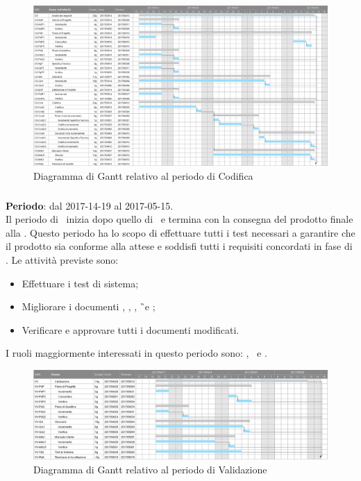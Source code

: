 		\begin{figure}[ht]
			\centering
			\includegraphics[scale=0.30]{img/ganttnetbreak4.png}
			\caption{Diagramma di Gantt relativo al periodo di Codifica}
		\end{figure}
		\FloatBarrier
		
		\subsubsection{\VV}
		\textbf{Periodo}: dal 2017-14-19 al 2017-05-15.\\
		Il periodo di \VV\ inizia dopo quello di \CO\ e termina con la consegna del prodotto finale alla \RA. Questo periodo ha lo scopo di effettuare tutti i test necessari a garantire che il prodotto sia conforme alla attese e soddisfi tutti i requisiti concordati in fase di \AdR. Le attività previste sono:
		\begin{itemize}
			\item Effettuare i test di sistema;
			\item Migliorare i documenti \NdP, \PdP, \PdQ, \G\ e \MU;
			\item Verificare e approvare tutti i documenti modificati.
		\end{itemize}
			I ruoli maggiormente interessati in questo periodo sono: \Res, \Prog\ e \Ver.
			
		\begin{figure}[ht]
			\centering
			\includegraphics[scale=0.35]{img/ganttnetbreak5.png}
			\caption{Diagramma di Gantt relativo al periodo di Validazione}
		\end{figure}
		\FloatBarrier
